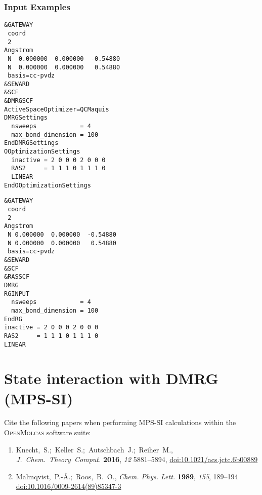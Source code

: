 \documentclass[bibliography=totoc,12pt,a4paper]{scrartcl}
\newcommand{\mol}{\textsc{OpenMolcas}}
\newcommand{\kwd}[1]{\texttt{#1}}
\begin{document}
\subsubsection{Input Examples}
\begin{lstlisting}[language=molcas,caption={(File \texttt{001.input} in the test directory) Input example for a DMRG-SCF calculation with the \kwd{DMRGSCF} module (\ch{N2}, 6 orbitals, with symmetry).},label=lst:dmrgscf]
&GATEWAY
 coord
 2
Angstrom
 N  0.000000  0.000000  -0.54880
 N  0.000000  0.000000   0.54880
 basis=cc-pvdz
&SEWARD
&SCF
&DMRGSCF
ActiveSpaceOptimizer=QCMaquis
DMRGSettings
  nsweeps            = 4
  max_bond_dimension = 100
EndDMRGSettings
OOptimizationSettings
  inactive = 2 0 0 0 2 0 0 0
  RAS2     = 1 1 1 0 1 1 1 0
  LINEAR
EndOOptimizationSettings
\end{lstlisting}
\vspace{-0.5em}
\begin{lstlisting}[language=molcas,caption={Input example for a DMRG-SCF calculation with the \kwd{RASSCF} module (\ch{N2}, 6 orbitals, with symmetry)},label=lst:rasscf]
&GATEWAY
 coord
 2
Angstrom
 N 0.000000  0.000000  -0.54880
 N 0.000000  0.000000   0.54880
 basis=cc-pvdz
&SEWARD
&SCF
&RASSCF
DMRG
RGINPUT
  nsweeps            = 4
  max_bond_dimension = 100
EndRG
inactive = 2 0 0 0 2 0 0 0
RAS2     = 1 1 1 0 1 1 1 0
LINEAR
\end{lstlisting}

\clearpage
\newpage

\section{State interaction with DMRG (MPS-SI)}\label{sec:mps-si}

\begin{framed}
 \noindent Cite the following papers when performing MPS-SI calculations within the \mol{} software suite:
\begin{enumerate}
\item Knecht,~S.;~Keller~S.;~Autschbach~J.;~Reiher~M., \emph{J.~Chem.~Theory~Comput.} \textbf{2016}, \emph{12} 5881--5894, \href{https://doi.org/10.1021/acs.jctc.6b00889}{doi:10.1021/acs.jctc.6b00889}
 \item Malmqvist,~P.-{\AA}.;~Roos,~B.~O., \emph{Chem. Phys. Lett.} \textbf{1989}, \emph{155}, 189--194\\ \href{https://doi.org/10.1016/0009-2614(89)85347-3}{doi:10.1016/0009-2614(89)85347-3}
\end{enumerate}
\end{framed}
\end{document}
